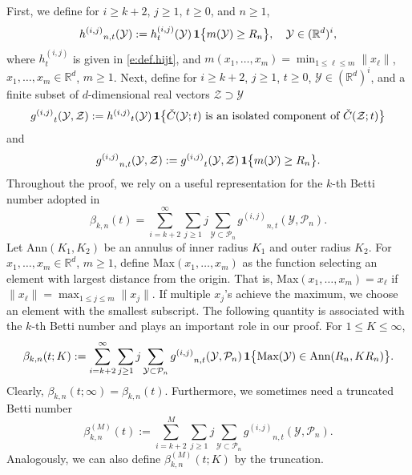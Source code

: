 \documentclass[11pt]{amsart}
\numberwithin{equation}{section}
\theoremstyle{plain}
\theoremstyle{definition}
\begin{document}
First, we define for $i \geq k+2$, $j \geq 1$, $t\geq0$, and $n\geq1$,
$$
{h^{(i,j)}}_{n,t}({{\mathcal{Y}}}) := h_t^{(i,j)}({{\mathcal{Y}}})\, {{\bf 1}} \bigl\{ m({{\mathcal{Y}}}) \geq R_n \bigr\}, \ \ \ {{\mathcal{Y}}} \in ({{\mathbb R}}^d)^i,
$$
where $h_t^{(i,j)}$ is given in \eqref{e:def.hijt}, and $m(x_1,\dots,x_m) = \min_{1 \leq \ell \leq m} \| x_\ell \|$, $x_1,\dots, x_m \in {{\mathbb R}}^d$, $m \geq 1$.
Next, define for $i \geq k+2$, $j\geq1$, $t\geq 0$, ${{\mathcal{Y}}} \in ({{\mathbb R}}^d)^i$, and a finite subset of $d$-dimensional real vectors $\mathcal Z \supset {{\mathcal{Y}}}$
$$
{g^{(i,j)}}_t({{\mathcal{Y}}}, \mathcal Z) := {h^{(i,j)}}_t({{\mathcal{Y}}})\, {{\bf 1}} \bigl\{ \check{C}({{\mathcal{Y}}}; t) \text{ is an isolated component of } \check{C}(\mathcal Z; t)  \bigr\}
$$
and
$$
{g^{(i,j)}}_{n,t}({{\mathcal{Y}}}, \mathcal Z) := {g^{(i,j)}}_t({{\mathcal{Y}}}, \mathcal Z)\, {{\bf 1}} \bigl\{ m({{\mathcal{Y}}}) \geq R_n \bigr\}.
$$
Throughout the proof, we rely on a useful representation for the $k$-th Betti number adopted in \cite{kahle:meckes:2015}
$$
\beta_{k,n}(t) = \sum_{i=k+2}^\infty \sum_{j\geq1} j \sum_{{{\mathcal{Y}}} \subset {\mathcal P_n}} {g^{(i,j)}}_{n,t}({{\mathcal{Y}}}, {\mathcal P_n}).
$$
Let Ann$(K_1,K_2)$ be an annulus of inner radius $K_1$ and outer radius $K_2$. For $x_1,\dots,x_m \in {{\mathbb R}}^d$, $m \geq 1$, define Max$(x_1,\dots,x_m)$ as the function selecting an element with largest distance from the origin. That is, Max$(x_1,\dots,x_m) = x_\ell$ if $\| x_\ell \| = \max_{1 \leq j \leq m}\| x_j \|$. If multiple $x_j$'s achieve the maximum, we choose an element with the smallest subscript.
The following quantity is associated with the $k$-th Betti number and plays an important role in our proof. For $1 \leq K \leq \infty$,
$$
\beta_{k,n}(t; K) := \sum_{i=k+2}^\infty \sum_{j\geq1} j \sum_{{{\mathcal{Y}}} \subset {\mathcal P_n}} {g^{(i,j)}}_{n,t}({{\mathcal{Y}}}, {\mathcal P_n})\, {{\bf 1}} \bigl\{ \text{Max}({{\mathcal{Y}}}) \in \text{Ann}(R_n, KR_n) \bigr\}.
$$
Clearly, $\beta_{k,n}(t; \infty) = \beta_{k,n}(t)$. Furthermore, we sometimes need a truncated Betti number
\begin{equation}  \label{e:truncated.betti}
\beta_{k,n}^{(M)}(t) := \sum_{i=k+2}^M \sum_{j\geq1} j \sum_{{{\mathcal{Y}}} \subset {\mathcal P_n}} {g^{(i,j)}}_{n,t}({{\mathcal{Y}}}, {\mathcal P_n}).
\end{equation}
Analogously, we can also define $\beta_{k,n}^{(M)}(t; K)$ by the truncation.
\end{document}
